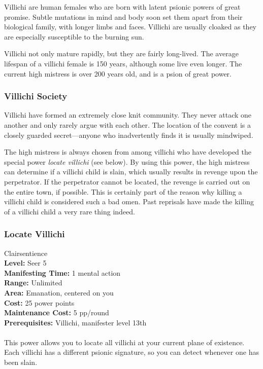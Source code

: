 Villichi are human females who are born with latent psionic powers of great promise. Subtle mutations in mind and body soon set them apart from their biological family, with longer limbs and faces. Villichi are usually cloaked as they are especially susceptible to the burning sun.

Villichi not only mature rapidly, but they are fairly long-lived. The average lifespan of a villichi female is 150 years, although some live even longer. The current high mistress is over 200 years old, and is a psion of great power.

\subsubsection{Villichi Society}
Villichi have formed an extremely close knit community. They never attack one another and only rarely argue with each other. The location of the convent is a closely guarded secret---anyone who inadvertently finds it is usually mindwiped.

The high mistress is always chosen from among villichi who have developed the special power \emph{locate villichi} (see below). By using this power, the high mistress can determine if a villichi child is slain, which usually results in revenge upon the perpetrator. If the perpetrator cannot be located, the revenge is carried out on the entire town, if possible. This is certainly part of the reason why killing a villichi child is considered such a bad omen. Past reprisals have made the killing of a villichi child a very rare thing indeed.



\subsubsection{Locate Villichi}
{
    {
        \setlength\parindent{0pt}
        Clairsentience\\
        \textbf{Level:} Seer 5\\
        \textbf{Manifesting Time:} 1 mental action\\
        \textbf{Range:} Unlimited\\
        \textbf{Area:} Emanation, centered on you\\
        \textbf{Cost:} 25 power points\\
        \textbf{Maintenance Cost:} 5 pp/round\\
        \textbf{Prerequisites:} Villichi, manifester level 13th\\
    }
    \\
    {
        \noindent This power allows you to locate all villichi at your current plane of existence. Each villichi has a different psionic signature, so you can detect whenever one has been slain.
    }
}


